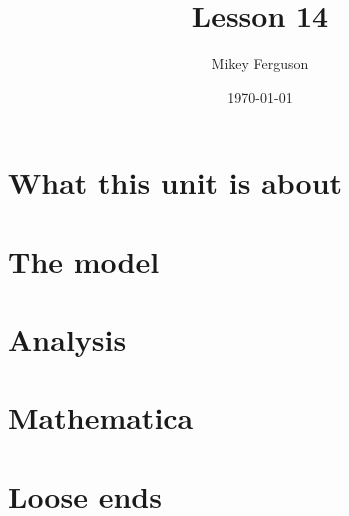 \documentclass[11pt]{article}
\title{Lesson 14}
\author{Mikey Ferguson}
\date{\today}
\begin{document}
\maketitle
\tableofcontents
\bigskip

\section{What this unit is about}

\section{The model}

\section{Analysis}

\section{Mathematica}

\section{Loose ends}
\end{document}
